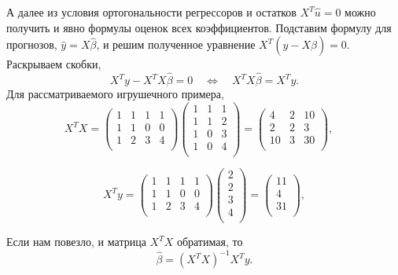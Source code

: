 \documentclass[12pt]{article}
\newcommand{\hb}{\hat{\beta}}
\newcommand{\hu}{\hat{u}}
\newcommand{\hy}{\hat{y}}
\begin{document}
А далее из условия ортогональности регрессоров и остатков $X^T \hu = 0$ можно получить и явно формулы оценок всех коэффициентов.
Подставим формулу для прогнозов, $\hy = X\hb$, и решим полученное уравнение $X^T (y - X\hb) = 0$.
Раскрываем скобки,
\[
X^T y - X^T X\hb = 0 \quad \Leftrightarrow \quad X^TX \hb = X^T y.
\]
Для рассматриваемого игрушечного примера,
\[
X^TX = \begin{pmatrix}
    1 & 1 & 1 & 1 \\
    1 & 1 & 0 & 0 \\
    1 & 2 & 3 & 4\\
\end{pmatrix}
\begin{pmatrix}
    1 & 1 & 1 \\
    1 & 1 & 2 \\
    1 & 0 & 3 \\
    1 & 0 & 4 \\
\end{pmatrix} = 
\begin{pmatrix}
    4 & 2 & 10 \\
    2 & 2 & 3 \\
    10 & 3 & 30 \\
\end{pmatrix}, \quad 
\]

\[
X^Ty = \begin{pmatrix}
    1 & 1 & 1 & 1 \\
    1 & 1 & 0 & 0 \\
    1 & 2 & 3 & 4\\
\end{pmatrix}
\begin{pmatrix}
    2 \\
    2 \\
    3 \\
    4 \\
\end{pmatrix}=
\begin{pmatrix}
    11 \\
    4 \\
    31 \\
\end{pmatrix},
\]

Если нам повезло, и матрица $X^TX$ обратимая, то 
\[
\hb = (X^TX)^{-1} X^Ty.
\]
\end{document}
